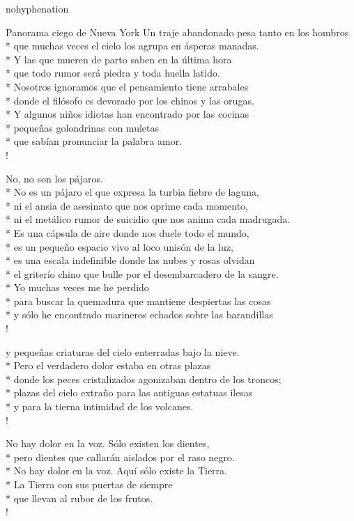 \documentclass[
    a5paper,
    DIV=10,
    12pt,
    notitlepage,
    oneside,]
{scrbook} %
\begin{document}
\begin{hyphenrules}{nohyphenation}
\begin{poem}{Panorama ciego de Nueva York}{}{}
Un traje abandonado pesa tanto en los hombros\\*
que muchas veces el cielo los agrupa en ásperas manadas.\\*
Y las que mueren de parto saben en la última hora\\*
que todo rumor será piedra y toda huella latido.\\*
Nosotros ignoramos que el pensamiento tiene arrabales\\*
donde el filósofo es devorado por los chinos y las orugas.\\*
Y algunos niños idiotas han encontrado por las cocinas\\*
pequeñas golondrinas con muletas\\*
que sabían pronunciar la palabra amor.\\!

No, no son los pájaros.\\*
No es un pájaro el que expresa la turbia fiebre de laguna,\\*
ni el ansia de asesinato que nos oprime cada momento,\\*
ni el metálico rumor de suicidio que nos anima cada madrugada.\\*
Es una cápsula de aire donde nos duele todo el mundo,\\*
es un pequeño espacio vivo al loco unisón de la luz,\\*
es una escala indefinible donde las nubes y rosas olvidan\\*
el griterío chino que bulle por el desembarcadero de la sangre.\\*
Yo muchas veces me he perdido\\*
para buscar la quemadura que mantiene despiertas las cosas\\*
y sólo he encontrado marineros echados sobre las barandillas \\!

y pequeñas criaturas del cielo enterradas bajo la nieve.\\*
Pero el verdadero dolor estaba en otras plazas\\*
donde los peces cristalizados agonizaban dentro de los troncos;\\*
plazas del cielo extraño para las antiguas estatuas ilesas\\*
y para la tierna intimidad de los volcanes.\\!

No hay dolor en la voz. Sólo existen los dientes,\\*
pero dientes que callarán aislados por el raso negro.\\*
No hay dolor en la voz. Aquí sólo existe la Tierra.\\*
La Tierra con sus puertas de siempre\\*
que llevan al rubor de los frutos.\\!


\end{poem}
\end{hyphenrules}
\end{document}

